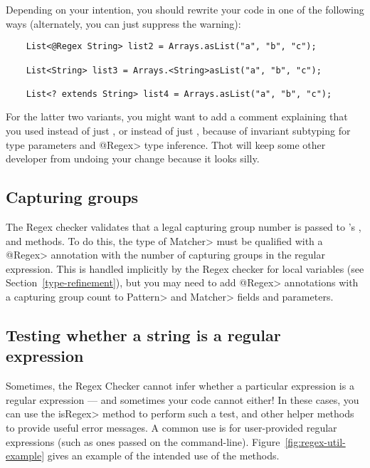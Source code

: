 Depending on your intention, you should rewrite your code in one of the
following ways (alternately, you can just suppress the warning):

\begin{Verbatim}
    List<@Regex String> list2 = Arrays.asList("a", "b", "c");

    List<String> list3 = Arrays.<String>asList("a", "b", "c");

    List<? extends String> list4 = Arrays.asList("a", "b", "c");
\end{Verbatim}

\noindent
For the latter two variants, you might want to add a comment explaining
that you used  instead of just , or
 instead of just , because
of invariant subtyping for type parameters and \<@Regex> type inference.
Thot will keep some other developer from undoing your change because it
looks silly.


\subsection{Capturing groups\label{regex-capturing-groups}}

The Regex checker validates that a legal capturing group number is passed
to 's
,
 and
 methods. To do this,
the type of \<Matcher> must be qualified with a \<@Regex> annotation
with the number of capturing groups in the regular expression. This is
handled implicitly by the Regex checker for local variables (see
Section~\ref{type-refinement}), but you may need to add \<@Regex> annotations
with a capturing group count to \<Pattern> and \<Matcher> fields and
parameters.

\subsection{Testing whether a string is a regular expression\label{regexutil-methods}}

Sometimes, the Regex Checker cannot infer whether a particular expression
is a regular expression --- and sometimes your code cannot either!  In
these cases, you can use the \<isRegex> method to perform such a test, and
other helper methods to provide useful error messages.  A
common use is for user-provided regular expressions (such as ones passed
on the command-line).
Figure~\ref{fig:regex-util-example} gives an
example of the intended use of the  methods.


